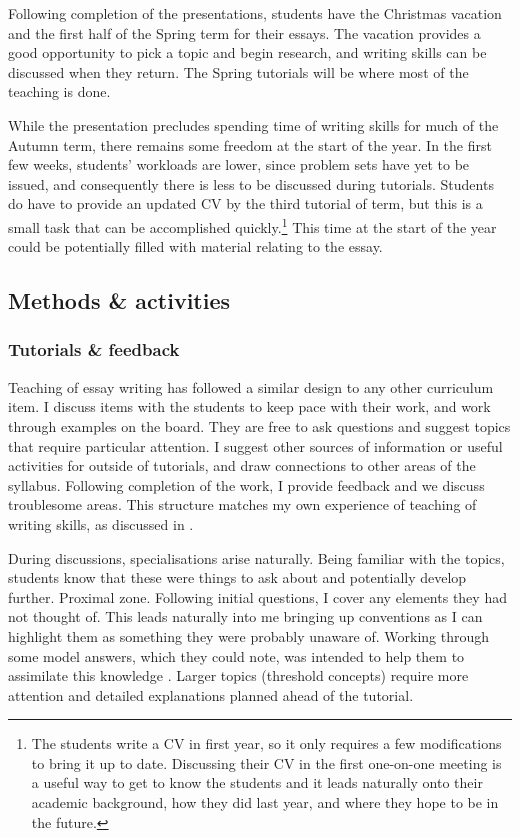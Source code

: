 Following completion of the presentations, students have the Christmas vacation and the first half of the Spring term for their essays. The vacation provides a good opportunity to pick a topic and begin research, and writing skills can be discussed when they return. The Spring tutorials will be where most of the teaching is done.

While the presentation precludes spending time of writing skills for much of the Autumn term, there remains some freedom at the start of the year. In the first few weeks, students' workloads are lower, since problem sets have yet to be issued, and consequently there is less to be discussed during tutorials. Students do have to provide an updated CV by the third tutorial of term, but this is a small task that can be accomplished quickly.\footnote{The students write a CV in first year, so it only requires a few modifications to bring it up to date. Discussing their CV in the first one-on-one meeting is a useful way to get to know the students and it leads naturally onto their academic background, how they did last year, and where they hope to be in the future.} This time at the start of the year could be potentially filled with material relating to the essay.

\subsection{Methods \& activities}\label{sec:essay-methods}

\subsubsection{Tutorials \& feedback}

Teaching of essay writing has followed a similar design to any other curriculum item. I discuss items with the students to keep pace with their work, and work through examples on the board. They are free to ask questions and suggest topics that require particular attention. I suggest other sources of information or useful activities for outside of tutorials, and draw connections to other areas of the syllabus. Following completion of the work, I provide feedback and we discuss troublesome areas. This structure matches my own experience of teaching of writing skills, as discussed in .

During discussions, specialisations arise naturally. Being familiar with the topics, students know that these were things to ask about and potentially develop further. Proximal zone. Following initial questions, I cover any elements they had not thought of. This leads naturally into me bringing up conventions as I can highlight them as something they were probably unaware of. Working through some model answers, which they could note, was intended to help them to assimilate this knowledge \citep[chapter 10]{Ramsden1992}. Larger topics (threshold concepts) require more attention and detailed explanations planned ahead of the tutorial.

